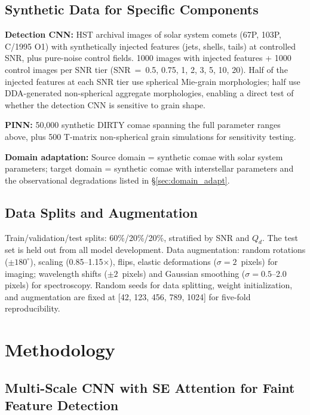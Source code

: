 \documentclass[usenatbib]{mnras}
\begin{document}
\subsection{Synthetic Data for Specific Components}

\textbf{Detection CNN:} HST archival images of solar system comets (67P, 103P, C/1995 O1) with synthetically injected features (jets, shells, tails) at controlled SNR, plus pure-noise control fields. 1000 images with injected features + 1000 control images per SNR tier (SNR~=~0.5, 0.75, 1, 2, 3, 5, 10, 20). Half of the injected features at each SNR tier use spherical Mie-grain morphologies; half use DDA-generated non-spherical aggregate morphologies, enabling a direct test of whether the detection CNN is sensitive to grain shape.

\textbf{PINN:} 50,000 synthetic DIRTY comae spanning the full parameter ranges above, plus 500 T-matrix non-spherical grain simulations for sensitivity testing.

\textbf{Domain adaptation:} Source domain = synthetic comae with solar system parameters; target domain = synthetic comae with interstellar parameters and the observational degradations listed in \S\ref{sec:domain_adapt}.

\subsection{Data Splits and Augmentation}

Train/validation/test splits: 60\%/20\%/20\%, stratified by SNR and $Q_d$. The test set is held out from all model development. Data augmentation: random rotations ($\pm 180^\circ$), scaling (0.85--1.15$\times$), flips, elastic deformations ($\sigma = 2$~pixels) for imaging; wavelength shifts ($\pm 2$~pixels) and Gaussian smoothing ($\sigma = 0.5$--2.0 pixels) for spectroscopy. Random seeds for data splitting, weight initialization, and augmentation are fixed at [42, 123, 456, 789, 1024] for five-fold reproducibility.

\section{Methodology}\label{sec:methods}

\subsection{Multi-Scale CNN with SE Attention for Faint Feature Detection}
\end{document}
